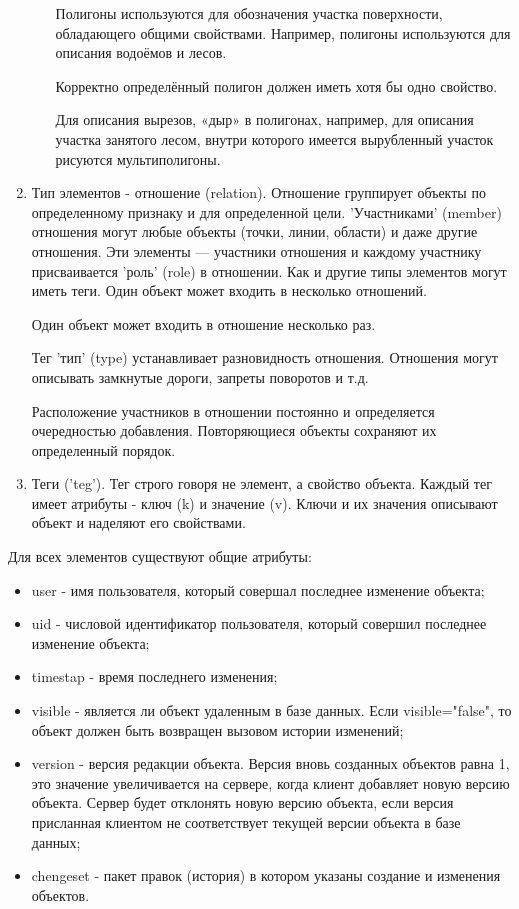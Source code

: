 \documentclass[12pt,a4paper,oneside]{article} %
\begin{document}
\begin{enumerate}
\begin{itemize}
    Полигоны используются для обозначения участка поверхности, обладающего общими свойствами. Например, полигоны используются для описания водоёмов и лесов.

    Корректно определённый полигон должен иметь хотя бы одно свойство.

    Для описания вырезов, «дыр» в полигонах, например, для описания участка занятого лесом, внутри которого имеется вырубленный участок рисуются мультиполигоны.
\end{itemize}
\item Тип элементов - отношение (relation). Отношение группирует объекты по определенному признаку и для определенной цели. 'Участниками' (member) отношения могут любые объекты (точки, линии, области) и даже другие отношения. Эти элементы — участники отношения и каждому участнику присваивается 'роль' (role) в отношении. Как и другие типы элементов могут иметь теги. Один объект может входить в несколько отношений.

    Один объект может входить в отношение несколько раз.

    Тег 'тип' (type) устанавливает разновидность отношения. Отношения могут описывать замкнутые дороги, запреты поворотов и т.д.

    Расположение участников в отношении постоянно и определяется очередностью добавления. Повторяющиеся объекты сохраняют их определенный порядок.

\item Теги ('teg'). Тег строго говоря не элемент, а свойство объекта. Каждый тег имеет атрибуты - ключ (k) и значение (v). Ключи и их значения описывают объект и наделяют его свойствами.
\end{enumerate}

Для всех элементов существуют общие атрибуты:

\begin{itemize}
\item user - имя пользователя, который совершал последнее изменение объекта;
\item uid - числовой идентификатор пользователя, который совершил последнее изменение объекта;
\item timestap - время последнего изменения;
\item visible - является ли объект удаленным в базе данных. Если visible="false", то объект должен быть возвращен вызовом истории изменений;
\item version - версия редакции объекта. Версия вновь созданных объектов равна 1, это значение увеличивается на сервере, когда клиент добавляет новую версию объекта. Сервер будет отклонять новую версию объекта, если версия присланная клиентом не соответствует текущей версии объекта в базе данных;
\item chengeset - пакет правок (история) в котором указаны создание и изменения объектов.
\end{itemize}
\end{document}
